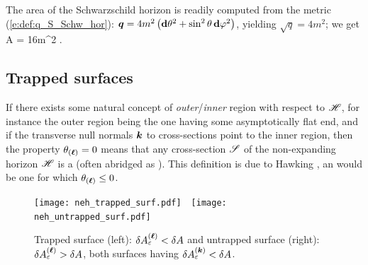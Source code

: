 \begin{example} \label{x:neh:Schwarz_hor_area}
The area of the Schwarzschild horizon is readily computed from
the metric (\ref{e:def:q_S_Schw_hor}):
$\bm{q} = 4m^2 \left( \mathbf{d}\theta^2 + \sin^2\theta \, \mathbf{d}\varphi^2 \right)$, yielding
$\sqrt{q}=4m^2$;
we get
\be \label{e:neh:area_Schwarz}
     A = 16\pi m^2 .
\ee
\end{example}

\subsection{Trapped surfaces} \label{s:neh:trapped_surfaces}

If there exists some natural concept of \emph{outer}/\emph{inner} region with respect
to $\mathscr{H}$, for
instance the outer region being the one having some asymptotically flat end,
and if the transverse null normals $\bm{k}$ to cross-sections point to the inner region, then
the property $\theta_{(\bm{\ell})}=0$ means that any cross-section $\mathscr{S}$ of the
non-expanding horizon $\mathscr{H}$ is a
(often abridged as ). This definition is due to
Hawking \cite{Hawki73}, an
would be one for which $\theta_{(\bm{\ell})}\leq 0$.

\begin{figure}
\centerline{\texttt{[image: neh\_trapped\_surf.pdf]}\ \qquad \
\texttt{[image: neh\_untrapped\_surf.pdf]}
}
\caption[]{\label{f:neh:trapped_surf} \footnotesize
Trapped surface (left): $\delta A^{(\bm{\ell})}_\varepsilon  < \delta A$
and untrapped surface (right): $\delta A^{(\bm{\ell})}_\varepsilon  > \delta A$,
both surfaces having $\delta A^{(\bm{k})}_\varepsilon  < \delta A$.
}
\end{figure}


